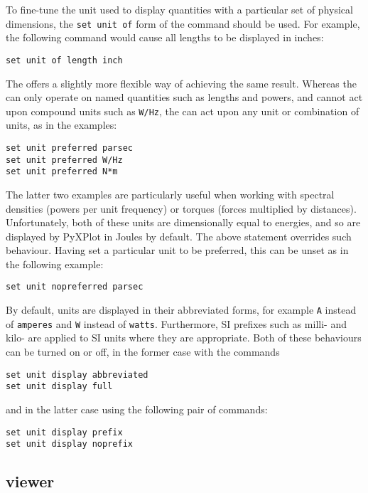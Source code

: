 To fine-tune the unit used to display quantities with a particular set of
physical dimensions, the {\tt set unit of} form of the command should be used.
For example, the following command would cause all lengths to be displayed in
inches:

\begin{verbatim}
set unit of length inch
\end{verbatim}

The  offers a slightly more flexible way of
achieving the same result. Whereas the  can only operate
on named quantities such as lengths and powers, and cannot act upon compound
units such as {\tt W/Hz}, the  can act upon any
unit or combination of units, as in the examples:
\begin{verbatim}
set unit preferred parsec
set unit preferred W/Hz
set unit preferred N*m
\end{verbatim}
The latter two examples are particularly useful when working with spectral
densities (powers per unit frequency) or torques (forces multiplied by
distances). Unfortunately, both of these units are dimensionally equal to
energies, and so are displayed by PyXPlot in Joules by default. The above
statement overrides such behaviour. Having set a particular unit to be
preferred, this can be unset as in the following example:
\begin{verbatim}
set unit nopreferred parsec
\end{verbatim}

By default, units are displayed in their abbreviated forms, for example {\tt A}
instead of {\tt amperes} and {\tt W} instead of {\tt watts}. Furthermore, SI
prefixes such as milli- and kilo- are applied to SI units where they are
appropriate. Both of these behaviours can be turned on or off, in the former
case with the commands

\begin{verbatim}
set unit display abbreviated
set unit display full
\end{verbatim}

\noindent and in the latter case using the following pair of commands:

\begin{verbatim}
set unit display prefix
set unit display noprefix
\end{verbatim}


\subsection{viewer}

